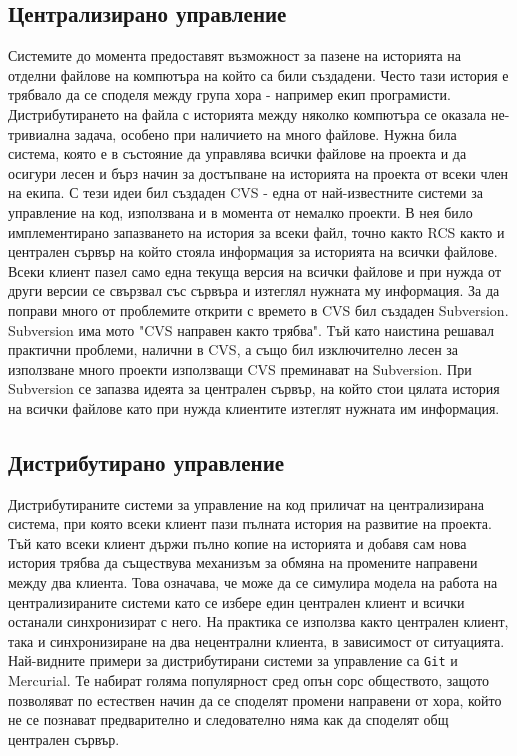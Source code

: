 \documentclass[a4paper]{article}
\def\git{\texttt{Git}}
\begin{document}
  \subsection{Централизирано управление}
  Системите до момента предоставят възможност за пазене на историята на отделни
  файлове на компютъра на който са били създадени. Често тази история е
  трябвало да се споделя между група хора - например екип програмисти.
  Дистрибутирането на файла с историята между няколко компютъра се оказала
  не-тривиална задача, особено при наличието на много файлове. Нужна била
  система, която е в състояние да управлява всички файлове на проекта и да
  осигури лесен и бърз начин за достъпване на историята на проекта от всеки
  член на екипа. С тези идеи бил създаден CVS\cite{cvs} - една от
  най-известните системи за управление на код, използвана и в момента от
  немалко проекти. В нея било имплементирано запазването на история за всеки
  файл, точно както RCS както и централен сървър на който стояла информация за
  историята на всички файлове. Всеки клиент пазел само една текуща версия на
  всички файлове и при нужда от други версии се свързвал със сървъра и изтеглял
  нужната му информация. За да поправи много от проблемите открити с времето в
  CVS бил създаден Subversion\cite{svn}. Subversion има мото "CVS направен
  както трябва". Тъй като наистина решавал практични проблеми, налични в CVS, а
  също бил изключително лесен за използване много проекти използващи CVS
  преминават на Subversion. При Subversion се запазва идеята за централен
  сървър, на който стои цялата история на всички файлове като при нужда
  клиентите изтеглят нужната им информация.

  \subsection{Дистрибутирано управление}
  Дистрибутираните системи за управление на код приличат на централизирана
  система, при която всеки клиент пази пълната история на развитие на проекта.
  Тъй като всеки клиент държи пълно копие на историята и добавя сам нова
  история трябва да съществува механизъм за обмяна на промените направени между
  два клиента. Това означава, че може да се симулира модела на работа на
  централизираните системи като се избере един централен клиент и всички
  останали синхронизират с него. На практика се използва както централен
  клиент, така и синхронизиране на два нецентрални клиента, в зависимост от
  ситуацията. Най-видните примери за дистрибутирани системи за управление са
  \git\cite{git} и Mercurial\cite{mercurial}. Те набират голяма популярност сред
  опън сорс обществото, защото позволяват по естествен начин да се споделят
  промени направени от хора, който не се познават предварително и следователно
  няма как да споделят общ централен сървър.
\end{document}
